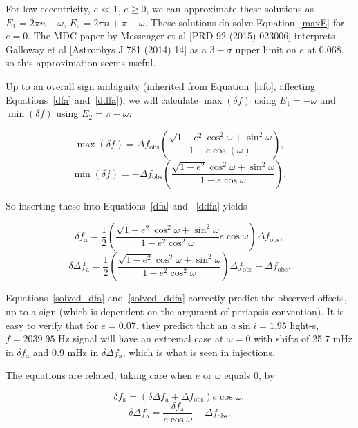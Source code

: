 \documentclass{article}
\begin{document}
\noindent For low eccentricity, $e \ll 1$, $e\geq 0$, we can approximate these solutions as $E_1 = 2\pi n - \omega$, $E_2 = 2\pi n + \pi - \omega$.
These solutions do solve Equation~\ref{maxE} for $e=0$.
The MDC paper by Messenger et al [PRD 92 (2015) 023006] interprets Galloway et al [Astrophys J 781 (2014) 14] as a $3-\sigma$ upper limit on $e$ at 0.068, so this approximation seems useful.

Up to an overall sign ambiguity (inherited from Equation~\ref{irfo}, affecting Equations~\ref{dfa} and~\ref{ddfa}), we will calculate $\max(\delta f)$ using $E_1 = -\omega$ and $\min(\delta f)$ using $E_2 = \pi-\omega$:

\begin{equation}
\max(\delta f) = \Delta f_\mathrm{obs} \left(\frac{\sqrt{1-e^2} \cos^2 \omega + \sin^2 \omega}{1-e \cos (\omega)} \right),
\label{maxdeltaf}
\end{equation}
\begin{equation}
\min(\delta f) = -\Delta f_\mathrm{obs} \left(\frac{\sqrt{1-e^2} \cos^2\omega + \sin^2 \omega}{1+e \cos \omega} \right),
\label{mindeltaf}
\end{equation}

\noindent So inserting these into Equations~\ref{dfa} and ~\ref{ddfa} yields

\begin{equation}
\delta f_\mathrm{a} = \frac{1}{2} \left( \frac{\sqrt{1-e^2} \cos^2 \omega + \sin^2 \omega}{1-e^2 \cos^2 \omega} e \cos \omega \right) \Delta f_\mathrm{obs},
\label{solved_dfa}
\end{equation}
\begin{equation}
\delta \Delta f_\mathrm{a} = \frac{1}{2} \left( \frac{\sqrt{1-e^2} \cos^2 \omega + \sin^2 \omega}{1-e^2 \cos^2 \omega} \right)  \Delta f_\mathrm{obs} - \Delta f_\mathrm{obs}.
\label{solved_ddfa}
\end{equation}

Equations~\ref{solved_dfa} and~\ref{solved_ddfa} correctly predict the observed offsets, up to a sign (which is dependent on the argument of periapsis convention).
It is easy to verify that for $e=0.07$, they predict that an $a\sin i = 1.95$ light-s, $f=2039.95$ Hz signal will have an extremal case at $\omega=0$ with shifts of 25.7 mHz in $\delta f_\mathrm{a}$ and 0.9 mHz in $\delta \Delta f_\mathrm{a}$, which is what is seen in injections.

The equations are related, taking care when $e$ or $\omega$ equals $0$, by

\begin{equation}
\delta f_\mathrm{a} = \left(\delta \Delta f_\mathrm{a} + \Delta f_\mathrm{obs} \right) e \cos \omega,
\end{equation}
\begin{equation}
\delta \Delta f_\mathrm{a} = \frac{\delta f_\mathrm{a}}{e \cos \omega} - \Delta f_\mathrm{obs}.
\end{equation}
\end{document}
